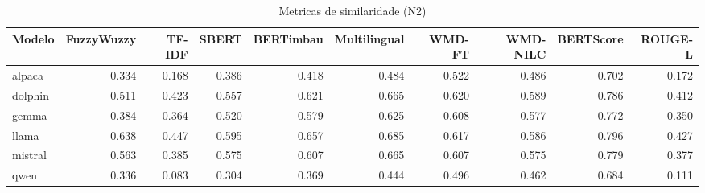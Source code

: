 \begin{table}[ht]
  \centering
  \caption{Metricas de similaridade (N2)}
  \label{tab:results_n2_similarity}
  \begin{tabular}{lrrrrrrrrr}
    \toprule
    Modelo & FuzzyWuzzy & TF-IDF & SBERT & BERTimbau & Multilingual & WMD-FT & WMD-NILC & BERTScore & ROUGE-L \\
    \midrule
    alpaca & 0.334 & 0.168 & 0.386 & 0.418 & 0.484 & 0.522 & 0.486 & 0.702 & 0.172 \\
    dolphin & 0.511 & 0.423 & 0.557 & 0.621 & 0.665 & 0.620 & 0.589 & 0.786 & 0.412 \\
    gemma & 0.384 & 0.364 & 0.520 & 0.579 & 0.625 & 0.608 & 0.577 & 0.772 & 0.350 \\
    llama & 0.638 & 0.447 & 0.595 & 0.657 & 0.685 & 0.617 & 0.586 & 0.796 & 0.427 \\
    mistral & 0.563 & 0.385 & 0.575 & 0.607 & 0.665 & 0.607 & 0.575 & 0.779 & 0.377 \\
    qwen & 0.336 & 0.083 & 0.304 & 0.369 & 0.444 & 0.496 & 0.462 & 0.684 & 0.111 \\
    \bottomrule
  \end{tabular}
\end{table}
